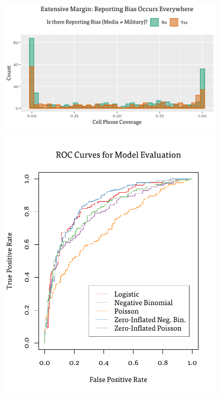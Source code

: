 \documentclass[article,36pt,extrafontsizes,oneside,openany,oldfontcommands]{memoir}
\begin{document}
\begin{adjmulticols*}{3}{0.5in}{0.5in}
\begin{adjustwidth}{0.1in}{0.1in}
\begin{figure}
\centering
\includegraphics[width=\linewidth]{extensive.pdf}
\end{figure}
\end{adjustwidth}


\begin{adjustwidth}{0.1in}{0.1in}
\begin{figure}
\vspace{-1.6in} 
\hspace{6.8in}
\includegraphics[width=.55\linewidth]{roc.pdf}
\end{figure}
\end{adjustwidth}



\end{adjmulticols*}
\end{document}
